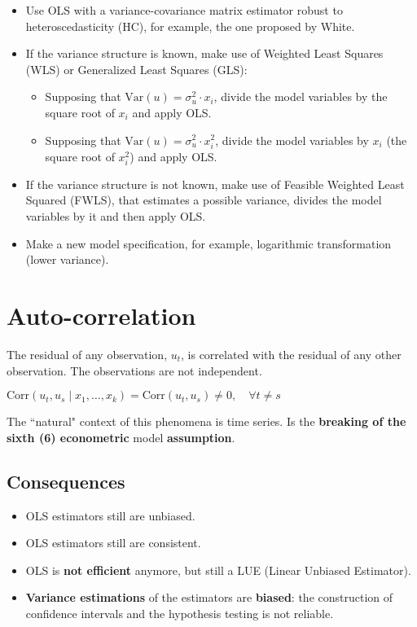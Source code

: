 \documentclass[10pt, a4paper, landscape]{extarticle}
\newcommand{\Var}{\mathrm{Var}}
\newcommand{\Corr}{\mathrm{Corr}}
\begin{document}
\begin{multicols}{3}
\begin{itemize}[leftmargin=*]
	\item Use OLS with a variance-covariance matrix estimator robust to heteroscedasticity (HC), for example, the one proposed by White.
	\item If the variance structure is known, make use of Weighted Least Squares (WLS) or Generalized Least Squares (GLS):
	\begin{itemize}[leftmargin=*]
		\item Supposing that $\Var(u) = \sigma^2_u \cdot x_i$, divide the model variables by the square root of $x_i$ and apply OLS.
		\item Supposing that $\Var(u) = \sigma^2_u \cdot x_i^2$, divide the model variables by $x_i$ (the square root of $x_i^2$) and apply OLS.
	\end{itemize}
	\item If the variance structure is not known, make use of Feasible Weighted Least Squared (FWLS), that estimates a possible variance, divides the model variables by it and then apply OLS.
	\item Make a new model specification, for example, logarithmic transformation (lower variance).
\end{itemize}

\columnbreak

\section*{Auto-correlation}

The residual of any observation, $u_t$, is correlated with the residual of any other observation. The observations are not independent.

\begin{center}
	$\Corr(u_t, u_s \mid x_1, \ldots, x_k) = \Corr(u_t, u_s) \neq 0, \quad \forall t \neq s$
\end{center}

The ``natural" context of this phenomena is time series. Is the \textbf{breaking of the sixth (6) econometric} model \textbf{assumption}.

\subsection*{Consequences}

\begin{itemize}[leftmargin=*]
	\item OLS estimators still are unbiased.
	\item OLS estimators still are consistent.
	\item OLS is \textbf{not efficient} anymore, but still a LUE (Linear Unbiased Estimator).
	\item \textbf{Variance estimations} of the estimators are \textbf{biased}: the construction of confidence intervals and the hypothesis testing is not reliable.
\end{itemize}


\end{multicols}
\end{document}
